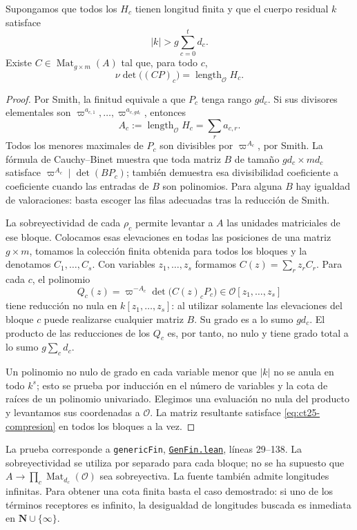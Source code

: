 \begin{lema}
\label{lem:ct25-compresion}
Supongamos que todos los $H_c$ tienen longitud finita y que el cuerpo residual $k$ satisface
\[
 |k|>g\sum_{c=0}^t d_c.
\]
Existe $C\in\operatorname{Mat}_{g\times m}(A)$ tal que, para todo $c$,
\begin{equation}
 \nu\det\bigl((CP)_c\bigr)
   =\operatorname{length}_{\mathcal O}H_c.
 \label{eq:ct25-compresion}
\end{equation}
\end{lema}
\begin{proof}
Por Smith, la finitud equivale a que $P_c$ tenga rango $gd_c$. Si sus divisores elementales son $\varpi^{a_{c,1}},\ldots,\varpi^{a_{c,gd_c}}$, entonces
\[
 A_c:=\operatorname{length}_{\mathcal O}H_c=\sum_r a_{c,r}.
\]
Todos los menores maximales de $P_c$ son divisibles por $\varpi^{A_c}$, por Smith. La fórmula de Cauchy--Binet muestra que toda matriz $B$ de tamaño $gd_c\times md_c$ satisface $\varpi^{A_c}\mid\det(BP_c)$; también demuestra esa divisibilidad coeficiente a coeficiente cuando las entradas de $B$ son polinomios. Para alguna $B$ hay igualdad de valoraciones: basta escoger las filas adecuadas tras la reducción de Smith.

La sobreyectividad de cada $\rho_c$ permite levantar a $A$ las unidades matriciales de ese bloque. Colocamos esas elevaciones en todas las posiciones de una matriz $g\times m$, tomamos la colección finita obtenida para todos los bloques y la denotamos $C_1,\ldots,C_s$. Con variables $z_1,\ldots,z_s$ formamos $C(z)=\sum_r z_rC_r$. Para cada $c$, el polinomio
\[
 Q_c(z)=\varpi^{-A_c}\det\bigl(C(z)_cP_c\bigr)\in\mathcal O[z_1,\ldots,z_s]
\]
tiene reducción no nula en $k[z_1,\ldots,z_s]$: al utilizar solamente las elevaciones del bloque $c$ puede realizarse cualquier matriz $B$. Su grado es a lo sumo $gd_c$. El producto de las reducciones de los $Q_c$ es, por tanto, no nulo y tiene grado total a lo sumo $g\sum_cd_c$.

Un polinomio no nulo de grado en cada variable menor que $|k|$ no se anula en todo $k^s$; esto se prueba por inducción en el número de variables y la cota de raíces de un polinomio univariado. Elegimos una evaluación no nula del producto y levantamos sus coordenadas a $\mathcal O$. La matriz resultante satisface \eqref{eq:ct25-compresion} en todos los bloques a la vez.
\end{proof}

La prueba corresponde a \texttt{genericFin}, \href{https://github.com/CocoSgt/riemann-hypothesis-lean/blob/7cbf7a0c32fca1badf05931879a37c3f8a2b03b4/src/Formalism/CharacterColumnKernels/IdempotentNormalForms/GenFin.lean}{\nolinkurl{GenFin.lean}}, líneas 29--138. La sobreyectividad se utiliza por separado para cada bloque; no se ha supuesto que $A\to\prod_c\operatorname{Mat}_{d_c}(\mathcal O)$ sea sobreyectiva. La fuente también admite longitudes infinitas. Para obtener una cota finita basta el caso demostrado: si uno de los términos receptores es infinito, la desigualdad de longitudes buscada es inmediata en $\mathbf N\cup\{\infty\}$.

